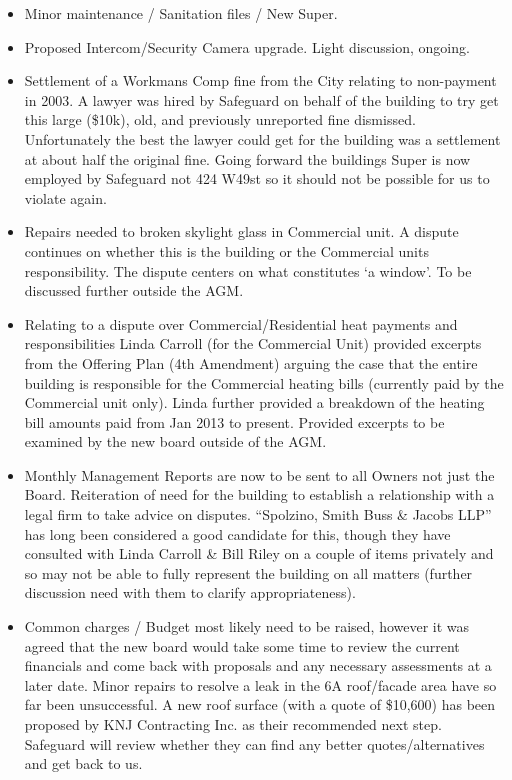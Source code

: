 \begin{itemize}

\item Minor maintenance / Sanitation files / New Super.

\item Proposed Intercom/Security Camera upgrade.  Light discussion, ongoing.

\item Settlement of a Workmans Comp fine from the City relating to non-payment in 
2003.  A lawyer was hired by Safeguard on behalf of the building to try get this 
large (\${}10k), old, and previously unreported fine dismissed.  Unfortunately 
the 
best the lawyer could get for the building was a settlement at about half the 
original fine.  Going forward the buildings Super is now employed by Safeguard 
not 424 W49st so it should not be possible for us to violate again. 

\item Repairs needed to broken skylight glass in Commercial unit.  A dispute continues 
on whether this is the building or the Commercial units responsibility.  The 
dispute centers on what constitutes ‘a window’.  To be discussed further outside 
the AGM.

\item Relating to a dispute over Commercial/Residential heat payments and 
responsibilities Linda Carroll (for the Commercial Unit) provided excerpts from 
the Offering Plan (4th Amendment) arguing the case that the entire building is 
responsible for the Commercial heating bills (currently paid by the Commercial 
unit only).   Linda further provided a breakdown of the heating bill amounts 
paid from Jan 2013 to present.  Provided excerpts to be examined by the new 
board outside of the AGM.

\item Monthly Management Reports are now to be sent to all Owners not just the Board.
Reiteration of need for the building to establish a relationship with a legal 
firm to take advice on disputes.  “Spolzino, Smith Buss \& Jacobs LLP” has long 
been considered a good candidate for this, though they have consulted with Linda 
Carroll \& Bill Riley on a couple of items privately and so may not be able to 
fully represent the building on all matters (further discussion need with them 
to clarify appropriateness).

\item Common charges / Budget most likely need to be raised, however it was agreed 
that the new board would take some time to review the current financials and 
come back with proposals and any necessary assessments at a later date.  Minor 
repairs to resolve a leak in the 6A roof/facade area have so far been 
unsuccessful.  A new roof surface (with a quote of \$10,600) has been proposed 
by KNJ Contracting Inc. as their recommended next step.  Safeguard will review 
whether they can find any better quotes/alternatives and get back to us.


\end{itemize}
